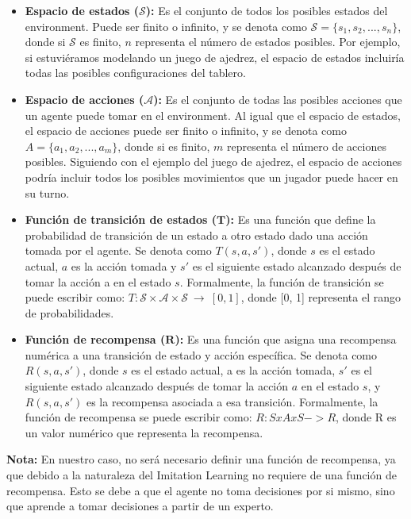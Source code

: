 \begin{itemize}
    \item \textbf{Espacio de estados ($\boldsymbol{\mathcal{S}}$):} Es el conjunto de todos los posibles estados del environment. 
    Puede ser finito o infinito, y se denota como $\mathcal{S} = \{s_1, s_2, ..., s_n\}$, donde si $\mathcal{S}$ es finito, $n$ representa 
    el número de estados posibles. Por ejemplo, si estuviéramos modelando un juego de ajedrez, el espacio 
    de estados incluiría todas las posibles configuraciones del tablero.

    \item \textbf{Espacio de acciones ($\boldsymbol{\mathcal{A}}$):} Es el conjunto de todas las posibles acciones que un agente 
    puede tomar en el environment. Al igual que el espacio de estados, el espacio de acciones puede ser finito 
    o infinito, y se denota como $A = \{a_1, a_2, ..., a_m\}$, donde si es finito, $m$ representa el número de 
    acciones posibles. Siguiendo con el ejemplo del juego de ajedrez, el espacio de acciones podría incluir 
    todos los posibles movimientos que un jugador puede hacer en su turno.

    \item \textbf{Función de transición de estados ($\boldsymbol{T}$):} Es una función que define la probabilidad de transición 
    de un estado a otro estado dado una acción tomada por el agente. Se denota como $T(s, a, s')$, donde $s$ es el 
    estado actual, $a$ es la acción tomada y $s'$ es el siguiente estado alcanzado después de tomar la acción a en 
    el estado $s$. Formalmente, la función de transición se puede escribir como: 
    $T: \mathcal{S} \times \mathcal{A} \times \mathcal{S} \ \rightarrow \ [0,1]$, donde 
    [0, 1] representa el rango de probabilidades.

    \item \textbf{Función de recompensa ($\boldsymbol{R}$):} Es una función que asigna una recompensa numérica a una transición 
    de estado y acción específica. Se denota como $R(s, a, s')$, donde $s$ es el estado actual, a es la acción tomada, 
    $s'$ es el siguiente estado alcanzado después de tomar la acción $a$ en el estado $s$, y $R(s, a, s')$ es 
    la recompensa asociada a esa transición. Formalmente, la función de recompensa se puede escribir 
    como: $R: S x A x S -> R$, donde R es un valor numérico que representa la recompensa. 
\end{itemize}

\textbf{Nota: } En nuestro caso, no será necesario definir una función de recompensa, ya que debido a la 
naturaleza del Imitation Learning no requiere de una función de recompensa. Esto se debe a que el agente 
no toma decisiones por si mismo, sino que aprende a tomar decisiones a partir de un experto.

